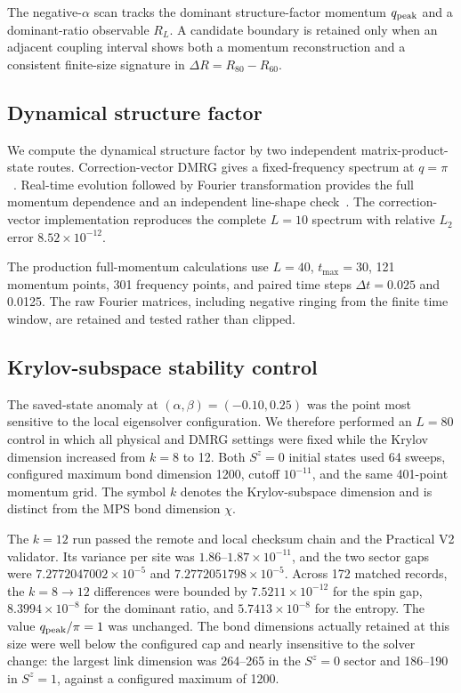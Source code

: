 The negative-$\alpha$ scan tracks the dominant structure-factor momentum $q_{\mathrm{peak}}$ and a dominant-ratio observable $R_L$.
A candidate boundary is retained only when an adjacent coupling interval shows both a momentum reconstruction and a consistent finite-size signature in $\Delta R=R_{80}-R_{60}$.

\subsection{Dynamical structure factor}

We compute the dynamical structure factor by two independent matrix-product-state routes.
Correction-vector DMRG gives a fixed-frequency spectrum at $q=\pi$~\cite{kuehner1999}.
Real-time evolution followed by Fourier transformation provides the full momentum dependence and an independent line-shape check~\cite{vidal2004,fishman2022}.
The correction-vector implementation reproduces the complete $L=10$ spectrum with relative $L_2$ error $8.52\times10^{-12}$.

The production full-momentum calculations use $L=40$, $t_{\max}=30$, 121 momentum points, 301 frequency points, and paired time steps $\Delta t=0.025$ and 0.0125.
The raw Fourier matrices, including negative ringing from the finite time window, are retained and tested rather than clipped.

\subsection{Krylov-subspace stability control}

The saved-state anomaly at $(\alpha,\beta)=(-0.10,0.25)$ was the point most sensitive to the local eigensolver configuration.
We therefore performed an $L=80$ control in which all physical and DMRG settings were fixed while the Krylov dimension increased from $k=8$ to 12.
Both $S^z=0$ initial states used 64 sweeps, configured maximum bond dimension 1200, cutoff $10^{-11}$, and the same 401-point momentum grid.
The symbol $k$ denotes the Krylov-subspace dimension and is distinct from the MPS bond dimension $\chi$.

The $k=12$ run passed the remote and local checksum chain and the Practical V2 validator.
Its variance per site was $1.86$--$1.87\times10^{-11}$, and the two sector gaps were $7.2772047002\times10^{-5}$ and $7.2772051798\times10^{-5}$.
Across 172 matched records, the $k=8\rightarrow12$ differences were bounded by $7.5211\times10^{-12}$ for the spin gap, $8.3994\times10^{-8}$ for the dominant ratio, and $5.7413\times10^{-8}$ for the entropy.
The value $q_{\mathrm{peak}}/\pi=1$ was unchanged.
The bond dimensions actually retained at this size were well below the configured cap and nearly insensitive to the solver change: the largest link dimension was 264--265 in the $S^z=0$ sector and 186--190 in $S^z=1$, against a configured maximum of 1200.

